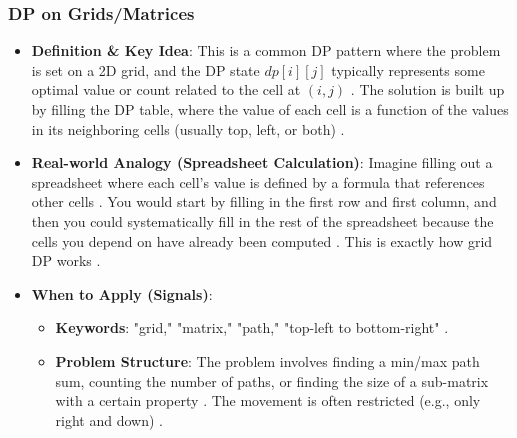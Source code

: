 \documentclass{article}
\begin{document}
\subsubsection{DP on Grids/Matrices}
\begin{itemize}
\item \textbf{Definition \& Key Idea}: This is a common DP pattern where the problem is set on a 2D grid, and the DP state $dp[i][j]$ typically represents some optimal value or count related to the cell at $(i, j)$ \cite{921, 922}. The solution is built up by filling the DP table, where the value of each cell is a function of the values in its neighboring cells (usually top, left, or both) \cite{923, 924}.
\item \textbf{Real-world Analogy (Spreadsheet Calculation)}: Imagine filling out a spreadsheet where each cell's value is defined by a formula that references other cells \cite{925, 926}. You would start by filling in the first row and first column, and then you could systematically fill in the rest of the spreadsheet because the cells you depend on have already been computed \cite{928, 929}. This is exactly how grid DP works \cite{929}.
\item \textbf{When to Apply (Signals)}:
\begin{itemize}
\item \textbf{Keywords}: "grid," "matrix," "path," "top-left to bottom-right" \cite{931}.
\item \textbf{Problem Structure}: The problem involves finding a min/max path sum, counting the number of paths, or finding the size of a sub-matrix with a certain property \cite{932}. The movement is often restricted (e.g., only right and down) \cite{933}.
\end{itemize}
\end{itemize}
\end{document}
